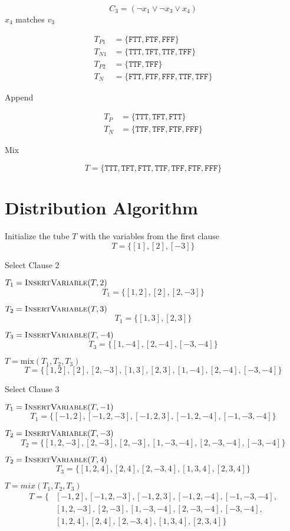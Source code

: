 \[
C_3 = (\neg x_1 \vee \neg x_3 \vee x_4)
\]
\noindent $x_4$ matches $v_3$

\begin{align*}
T_{P1} &= \{\texttt{FTT}, \texttt{FTF}, \texttt{FFF}\}\\
T_{N1} &= \{\texttt{TTT}, \texttt{TFT}, \texttt{TTF}, \texttt{TFF}\}\\
T_{P2} &= \{\texttt{TTF}, \texttt{TFF}\}\\
T_N &= \{\texttt{FTT}, \texttt{FTF}, \texttt{FFF}, \texttt{TTF}, \texttt{TFF}\}
\end{align*}

\noindent Append

\begin{align*}
T_P &= \{\texttt{TTT}, \texttt{TFT}, \texttt{FTT}\}\\
T_N &= \{\texttt{TTF}, \texttt{TFF}, \texttt{FTF}, \texttt{FFF}\}
\end{align*}

\noindent Mix

\[
T = \{\texttt{TTT}, \texttt{TFT}, \texttt{FTT}, \texttt{TTF}, \texttt{TFF}, \texttt{FTF}, \texttt{FFF}\}
\]


\section{Distribution Algorithm}

Initialize the tube $T$ with the variables from the first clause
\[
	T = \{[1], [2], [-3]\}
\]	

\noindent Select Clause 2


\par $T_1 =	\text{{\sc InsertVariable}}(T, 2)$
\[
		T_1 =  \{[1,2], [2], [2,-3]\}
\]
\par $T_2 =	\text{{\sc InsertVariable}}(T, 3)$
\[	
		T_1 =  \{[1,3], [2,3]\}	
\]
\par $T_3 =	\text{{\sc InsertVariable}}(T, -4)$
\[	
		T_3 =  \{[1,-4], [2,-4], [-3,-4]\}			
\]		
\par $T = \text{mix}(T_1, T_2, T_3)$
\[	
		T = \{[1,2], [2], [2,-3], [1,3], [2,3], [1,-4], [2,-4], [-3,-4]\}
\]		

\noindent Select Clause 3
	
\par $T_1 = 	\text{{\sc InsertVariable}}(T, -1)$
\[
		T_1 = \{[-1,2], [-1,2,-3], [-1,2,3], [-1,2,-4], [-1,-3,-4]\}
\]	
\par $T_2 =	\text{{\sc InsertVariable}}(T, -3)$
\[
		T_2 = \{[1,2,-3], [2,-3], [2,-3], [1,-3,-4], [2,-3,-4], [-3,-4]\}
\]
\par $T_2 =	\text{{\sc InsertVariable}}(T, 4)$
\[
		T_3 = \{[1,2,4], [2,4], [2,-3,4], [1,3,4], [2,3,4]\}
\]
\par $T = mix(T_1, T_2, T_3)$
\begin{align*}
		T = \{&[-1,2], [-1,2,-3], [-1,2,3], [-1,2,-4], [-1,-3,-4],\\
			  &[1,2,-3], [2,-3], [1,-3,-4], [2,-3,-4], [-3,-4],\\
			  &[1,2,4], [2,4], [2,-3,4], [1,3,4], [2,3,4]\}
\end{align*}

